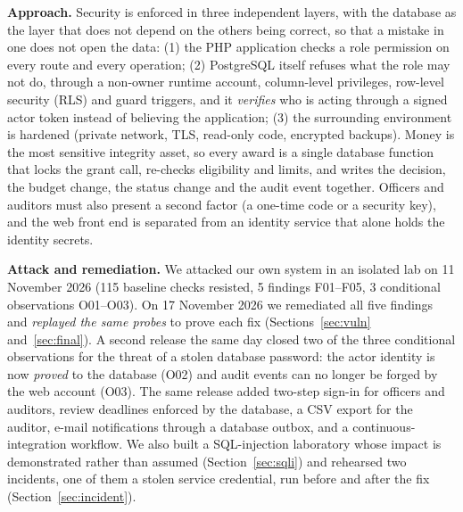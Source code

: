 \documentclass[10pt,a4paper]{article}
\begin{document}
\textbf{Approach.} Security is enforced in three independent layers, with the database as the layer that does not depend on the others being correct, so that a mistake in one does not open the data: (1) the PHP application checks a role permission on every route and every operation; (2) PostgreSQL itself refuses what the role may not do, through a non-owner runtime account, column-level privileges, row-level security (RLS) and guard triggers, and it \emph{verifies} who is acting through a signed actor token instead of believing the application; (3) the surrounding environment is hardened (private network, TLS, read-only code, encrypted backups). Money is the most sensitive integrity asset, so every award is a single database function that locks the grant call, re-checks eligibility and limits, and writes the decision, the budget change, the status change and the audit event together. Officers and auditors must also present a second factor (a one-time code or a security key), and the web front end is separated from an identity service that alone holds the identity secrets.

\textbf{Attack and remediation.} We attacked our own system in an isolated lab on 11 November 2026 (115 baseline checks resisted, 5 findings F01--F05, 3 conditional observations O01--O03). On 17 November 2026 we remediated all five findings and \emph{replayed the same probes} to prove each fix (Sections~\ref{sec:vuln} and~\ref{sec:final}). A second release the same day closed two of the three conditional observations for the threat of a stolen database password: the actor identity is now \emph{proved} to the database (O02) and audit events can no longer be forged by the web account (O03). The same release added two-step sign-in for officers and auditors, review deadlines enforced by the database, a CSV export for the auditor, e-mail notifications through a database outbox, and a continuous-integration workflow. We also built a SQL-injection laboratory whose impact is demonstrated rather than assumed (Section~\ref{sec:sqli}) and rehearsed two incidents, one of them a stolen service credential, run before and after the fix (Section~\ref{sec:incident}).
\end{document}

